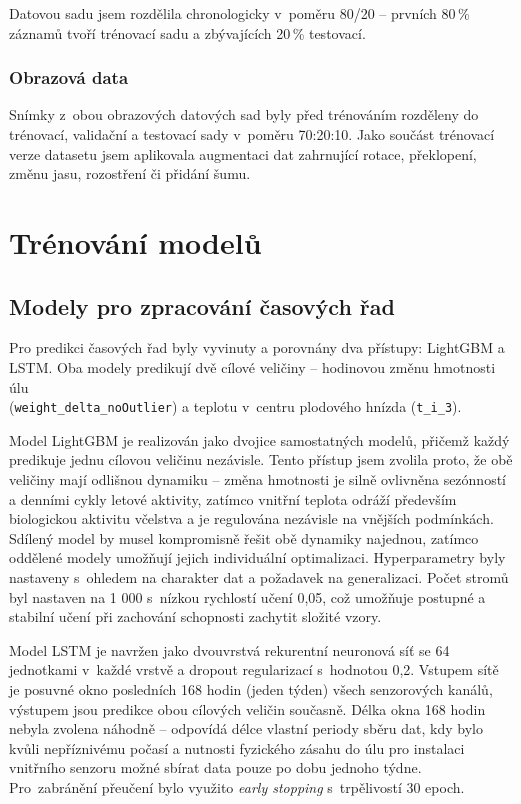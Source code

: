 Datovou sadu jsem rozdělila chronologicky v~poměru 80/20 -- prvních 80\,\% záznamů tvoří trénovací sadu a zbývajících 20\,\% testovací. 

\subsubsection*{Obrazová data}
Snímky z~obou obrazových datových sad byly před trénováním rozděleny do trénovací, validační a testovací sady v~poměru 70:20:10. Jako součást trénovací verze datasetu jsem aplikovala augmentaci dat zahrnující rotace, překlopení, změnu jasu, rozostření či přidání šumu.

\section{Trénování modelů}

\subsection*{Modely pro zpracování časových řad}
Pro predikci časových řad byly vyvinuty a porovnány dva přístupy: LightGBM a LSTM. Oba modely predikují dvě cílové veličiny -- hodinovou změnu hmotnosti úlu \\
(\texttt{weight\_delta\_noOutlier}) a teplotu v~centru plodového hnízda (\texttt{t\_i\_3}).

Model LightGBM je realizován jako dvojice samostatných modelů, přičemž každý predikuje jednu cílovou veličinu nezávisle. Tento přístup jsem zvolila proto, že obě veličiny mají odlišnou dynamiku -- změna hmotnosti je silně ovlivněna sezónností a denními cykly letové aktivity, zatímco vnitřní teplota odráží především biologickou aktivitu včelstva a je regulována nezávisle na vnějších podmínkách. Sdílený model by musel kompromisně řešit obě dynamiky najednou, zatímco oddělené modely umožňují jejich individuální optimalizaci. Hyperparametry byly nastaveny s~ohledem na charakter dat a požadavek na generalizaci. Počet stromů byl nastaven na 1 000 s~nízkou rychlostí učení 0,05, což umožňuje postupné a stabilní učení při zachování schopnosti zachytit složité vzory.

Model LSTM je navržen jako dvouvrstvá rekurentní neuronová síť se 64 jednotkami v~každé vrstvě a dropout regularizací s~hodnotou 0,2. Vstupem sítě je posuvné okno posledních 168 hodin (jeden týden) všech senzorových kanálů, výstupem jsou predikce obou cílových veličin současně. Délka okna 168 hodin nebyla zvolena náhodně -- odpovídá délce vlastní periody sběru dat, kdy bylo kvůli nepříznivému počasí a nutnosti fyzického zásahu do úlu pro instalaci vnitřního senzoru možné sbírat data pouze po dobu jednoho týdne. Pro~zabránění přeučení bylo využito \textit{early stopping} s~trpělivostí 30 epoch.

